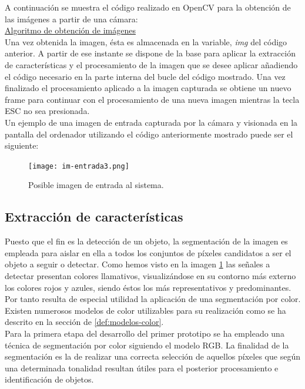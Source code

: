 A continuación se muestra el código realizado en OpenCV para la obtención de las imágenes a partir de una cámara:\\

\underline{Algoritmo de obtención de imágenes}\\


Una vez obtenida la imagen, ésta es almacenada en la variable, \emph{img} del código anterior. A partir de ese instante se dispone de la base para aplicar la extracción de características y el procesamiento de la imagen que se desee aplicar añadiendo el código necesario en la parte interna del bucle del código mostrado. Una vez finalizado el procesamiento aplicado a la imagen capturada se obtiene un nuevo frame para continuar con el procesamiento de una nueva imagen mientras la tecla ESC no sea presionada.\\

Un ejemplo de una imagen de entrada capturada por la cámara y visionada en la pantalla del ordenador utilizando el código anteriormente mostrado puede ser el siguiente:\\

\begin{figure}[H]
  \begin{center}
    \texttt{[image: im-entrada3.png]}
  \end{center}
  \caption{Posible imagen de entrada al sistema.}
  \label{imagen-entrada-rp}
\end{figure}


\subsection{Extracción de características}
\label{sec:extraccion-caracteristicas}

Puesto que el fin es la detección de un objeto, la segmentación de la imagen es empleada para aislar en ella a todos los conjuntos de píxeles candidatos a ser el objeto a seguir o detectar. Como hemos visto en la imagen \ref{imagen-entrada-rp} las señales a detectar presentan colores llamativos, visualizándose en su contorno más externo los colores rojos y azules, siendo éstos los más representativos y predominantes. Por tanto resulta de especial utilidad la aplicación de una segmentación por color. Existen numerosos modelos de color utilizables para su realización como se ha descrito en la sección de \ref{def:modelos-color}.\\

Para la primera etapa del desarrollo del primer prototipo se ha empleado una técnica de segmentación por color siguiendo el modelo RGB. La finalidad de la segmentación es la de realizar una correcta selección de aquellos píxeles que según una determinada tonalidad resultan útiles para el posterior procesamiento e identificación de objetos. 


